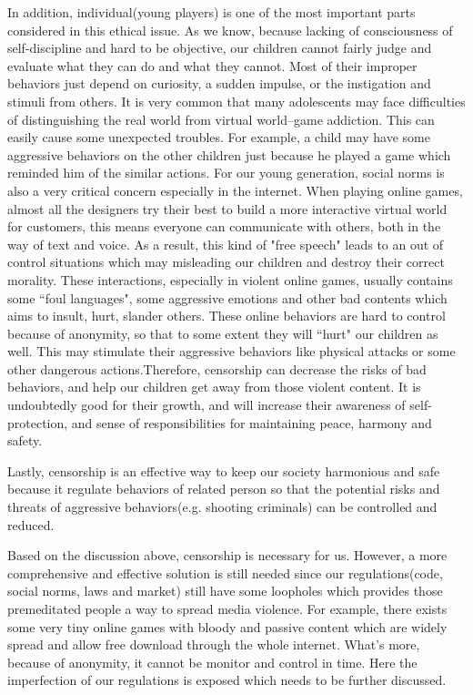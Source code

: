 In addition, individual(young players) is one of the most important parts considered in this ethical issue. As we know, because lacking of consciousness of self-discipline and hard to be objective, our children cannot fairly judge and evaluate what they can do and what they cannot. Most of their improper behaviors just depend on curiosity,  a sudden impulse, or the instigation and stimuli from others. It is very common that many adolescents may face difficulties of distinguishing the real world from virtual world--game addiction. This can easily cause some unexpected troubles. For example, a child may have some aggressive behaviors on the other children just because he played a game which reminded him of the similar actions. For our young generation, social norms is also a very critical concern especially in the internet. When playing online games, almost all the designers try their best to build a more interactive virtual world for customers, this means everyone can communicate with others, both in the way of text and voice. As a result, this kind of "free speech" leads to an out of control situations which may misleading our children and destroy their correct morality. These interactions, especially in violent online games, usually contains some ``foul languages", some aggressive emotions and other bad contents which aims to insult, hurt, slander others. These online behaviors are hard to control because of anonymity, so that to some extent they will ``hurt" our children as well. This may stimulate their aggressive behaviors like physical attacks or some other dangerous actions.Therefore, censorship can decrease the risks of bad behaviors, and help our children get away from those violent content. It is undoubtedly good for their growth, and will increase their awareness of self-protection, and sense of responsibilities for  maintaining peace, harmony and safety.

Lastly, censorship is an effective way to keep our society harmonious and safe because it regulate behaviors of related person so that the potential risks and threats of aggressive behaviors(e.g. shooting criminals) can be controlled and reduced.

Based on the discussion above, censorship is necessary for us. However, a more comprehensive and effective solution is still needed since our regulations(code, social norms, laws and market) still have some loopholes which provides those premeditated people a way to spread media violence. For example, there exists some very tiny online games with bloody and passive content which are widely spread and allow free download through the whole internet. What's more, because of anonymity, it cannot be monitor and control in time. Here the imperfection of our regulations is exposed which needs to be further discussed.









